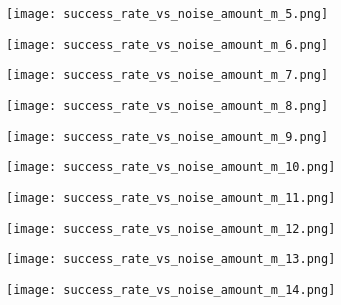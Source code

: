 \documentclass{article}
\begin{document}
\begin{figure}[H]
    \centering
    \begin{minipage}{0.45\textwidth}
        \centering
        \texttt{[image: success\_rate\_vs\_noise\_amount\_m\_5.png]}
    \end{minipage}
    \hfill
    \begin{minipage}{0.45\textwidth}
        \centering
        \texttt{[image: success\_rate\_vs\_noise\_amount\_m\_6.png]}
    \end{minipage}
\end{figure}
\begin{figure}[H]
    \centering
    \begin{minipage}{0.45\textwidth}
        \centering
        \texttt{[image: success\_rate\_vs\_noise\_amount\_m\_7.png]}
    \end{minipage}
    \hfill
    \begin{minipage}{0.45\textwidth}
        \centering
        \texttt{[image: success\_rate\_vs\_noise\_amount\_m\_8.png]}
    \end{minipage}
\end{figure}
\begin{figure}[H]
    \centering
    \begin{minipage}{0.45\textwidth}
        \centering
        \texttt{[image: success\_rate\_vs\_noise\_amount\_m\_9.png]}
    \end{minipage}
    \hfill
    \begin{minipage}{0.45\textwidth}
        \centering
        \texttt{[image: success\_rate\_vs\_noise\_amount\_m\_10.png]}
    \end{minipage}
\end{figure}
\begin{figure}[H]
    \centering
    \begin{minipage}{0.45\textwidth}
        \centering
        \texttt{[image: success\_rate\_vs\_noise\_amount\_m\_11.png]}
    \end{minipage}
    \hfill
    \begin{minipage}{0.45\textwidth}
        \centering
        \texttt{[image: success\_rate\_vs\_noise\_amount\_m\_12.png]}
    \end{minipage}
\end{figure}
\begin{figure}[H]
    \centering
    \begin{minipage}{0.45\textwidth}
        \centering
        \texttt{[image: success\_rate\_vs\_noise\_amount\_m\_13.png]}
    \end{minipage}
    \hfill
    \begin{minipage}{0.45\textwidth}
        \centering
        \texttt{[image: success\_rate\_vs\_noise\_amount\_m\_14.png]}
    \end{minipage}
\end{figure}
\end{document}
